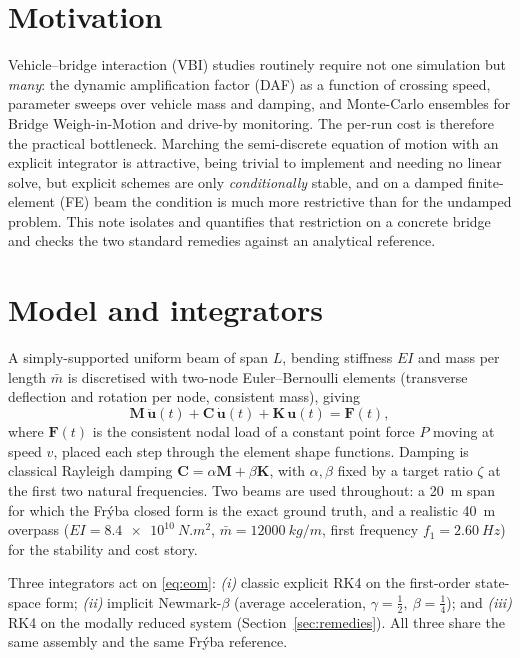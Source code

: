 \documentclass[11pt,a4paper]{article}
\begin{document}
\section{Motivation}
Vehicle--bridge interaction (VBI) studies routinely require not one simulation
but \emph{many}: the dynamic amplification factor (DAF) as a function of crossing
speed, parameter sweeps over vehicle mass and damping, and Monte-Carlo ensembles
for Bridge Weigh-in-Motion and drive-by monitoring. The per-run cost is therefore
the practical bottleneck. Marching the semi-discrete equation of motion with an
explicit integrator is attractive, being trivial to implement and needing no
linear solve, but explicit schemes are only \emph{conditionally} stable, and
on a damped finite-element (FE) beam the condition is much more restrictive
than for the undamped problem. This note isolates and quantifies that
restriction on a concrete bridge and checks the two standard remedies against
an analytical reference.

\section{Model and integrators}
A simply-supported uniform beam of span \(L\), bending stiffness \(EI\) and mass
per length \(\bar m\) is discretised with two-node Euler--Bernoulli elements
(transverse deflection and rotation per node, consistent mass), giving
\begin{equation}
  \mathbf M\,\ddot{\mathbf u}(t) + \mathbf C\,\dot{\mathbf u}(t)
  + \mathbf K\,\mathbf u(t) = \mathbf F(t),
  \label{eq:eom}
\end{equation}
where \(\mathbf F(t)\) is the consistent nodal load of a constant point force
\(P\) moving at speed \(v\), placed each step through the element shape functions.
Damping is classical Rayleigh damping
\(\mathbf C = \alpha\mathbf M + \beta\mathbf K\), with \(\alpha,\beta\) fixed by a
target ratio \(\zeta\) at the first two natural frequencies. Two beams are used
throughout: a \SI{20}{m} span for which the Fr\'yba closed form is the exact
ground truth, and a realistic \SI{40}{m} overpass
(\(EI=\SI{8.4e10}{N.m^2}\), \(\bar m=\SI{12000}{kg/m}\),
first frequency \(f_1=\SI{2.60}{Hz}\)) for the stability and cost story.

Three integrators act on \eqref{eq:eom}: \emph{(i)} classic explicit RK4 on the
first-order state-space form; \emph{(ii)} implicit Newmark-\(\beta\)
(average acceleration, \(\gamma=\tfrac12,\ \beta=\tfrac14\)); and \emph{(iii)}
RK4 on the modally reduced system (Section~\ref{sec:remedies}). All three share
the same assembly and the same Fr\'yba reference.
\end{document}
